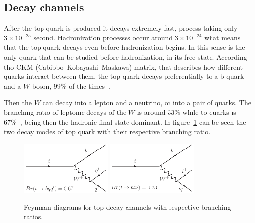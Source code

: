 
\subsection{Decay channels}

After the top quark is produced it decays extremely fast, process taking only $3\times 10^{-25}$ second. Hadronization processes occur around $3\times 10^{-24}$ what means that the top quark decays even before hadronization begins. In this sense is the only quark that can be studied before hadronization, in its free state. According tho CKM (Cabibbo–Kobayashi–Maskawa) matrix, that describes how different quarks interact between them, the top quark decays preferentially to a b-quark and a $W$ boson, 99\% of the times~\cite{Agashe:2014kda}. 

Then the $W$ can decay into a lepton and a neutrino, or into a pair of quarks. The branching ratio of leptonic decays of the $W$ is around 33\% while to quarks is 67\%~\cite{Agashe:2014kda}, being then the hadronic final state dominant. In figure~\ref{fig:BRratiosandDecayChannels} can be seen the two decay modes of top quark with their respective branching ratio. 

\begin{figure}[!Hhtbp]
  \begin{center}
    \includegraphics[width=0.4\textwidth]{figs/Top_H_Decay.png}
    \includegraphics[width=0.4\textwidth]{figs/Top_L_Decay.png}
    \caption{Feynman diagrams for top decay channels with respective branching ratios.}
    \label{fig:BRratiosandDecayChannels}
  \end{center}
\end{figure}

